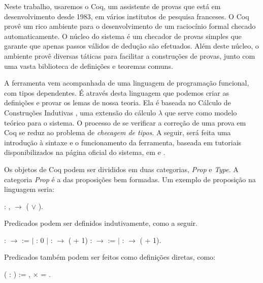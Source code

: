 Neste trabalho, usaremos o Coq, um assistente de provas que está em
desenvolvimento desde 1983, em vários institutos de pesquisa franceses. O Coq
provê um rico ambiente para o desenvolvimento de um raciocínio formal checado
automaticamente. O núcleo do sistema é um checador de provas simples que garante
que apenas passos válidos de dedução são efetuados. Além deste núcleo, o
ambiente provê diversas táticas para facilitar a construções de provas, junto
com uma vasta biblioteca de definições e teoremas comuns.

A ferramenta vem acompanhada de uma linguagem de programação funcional, com
tipos dependentes. É através desta linguagem que podemos criar as definições e
provar os lemas de nossa teoria. Ela é baseada no Cálculo de Construções
Indutivas \cite{coquand}, uma extensão do cálculo $\lambda$ que serve como modelo
teórico para o sistema. O processo de se verificar a correção de uma prova em
Coq se reduz ao problema de \emph{checagem de tipos}. A seguir, será feita uma
introdução à sintaxe e o funcionamento da ferramenta, baseada em tutoriais
disponibilizados na página oficial do sistema, em \cite{coq} e \cite{coq2}.


Os objetos de Coq podem ser divididos em duas categorias, \emph{Prop} e
\emph{Type}. A categoria \emph{Prop} é a das proposições bem formadas. Um
exemplo de proposição na linguagem seria:

\bigskip
\coqdockw{\ensuremath{\forall}}   : ,
 \ensuremath{\rightarrow} ( \ensuremath{\lor}
).\coqdoceol
\bigskip

Predicados podem ser definidos indutivamente, como a seguir.

\bigskip {}  : 
\ensuremath{\rightarrow}  :=\coqdoceol 
\coqdocindent{2.00em}\ensuremath{|}  :  0\coqdoceol
\coqdocindent{2.00em}\ensuremath{|}   :
  \ensuremath{\rightarrow} 
( + 1)\coqdoceol {}  :
 \ensuremath{\rightarrow}  :=\coqdoceol
\coqdocindent{2.00em}\ensuremath{|}   :
  \ensuremath{\rightarrow} 
( + 1).\coqdoceol \bigskip

Predicados também podem ser feitos como definições diretas, como:

\bigskip
{}  ( : ) :=
\coqdoctac{\ensuremath{\exists}} , 
\ensuremath{\times}  = .\coqdoceol
\bigskip

